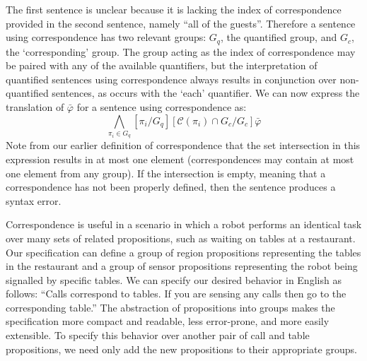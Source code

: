 The first sentence is unclear because it is lacking the index of correspondence provided in the second sentence, namely ``all of the guests''. 
Therefore a sentence using correspondence has two relevant groups: $G_q$, the quantified group, and $G_c$, the `corresponding' group. 
The group acting as the index of correspondence may be paired with any of the available quantifiers, but the interpretation of quantified sentences using correspondence always results in conjunction over non-quantified sentences, as occurs with the `each' quantifier. 
We can now express the translation of $\bar{\varphi}$ for a sentence using correspondence as:
\begin{equation*}
	\bigwedge \limits_{\pi_i \in G_q} [\pi_i / G_q] [\mathcal{C}(\pi_i) \cap G_c / G_c] \bar{\varphi}
\end{equation*}
Note from our earlier definition of correspondence that the set intersection in this expression results in at most one element (correspondences may contain at most one element from any group). 
If the intersection is empty, meaning that a correspondence has not been properly defined, then the sentence produces a syntax error. 

\begin{myExample}\label{Ex:corresponding}
	Correspondence is useful in a scenario in which a robot performs an identical task over many sets of related propositions, such as waiting on tables at a restaurant. 
	Our specification can define a group of region propositions representing the tables in the restaurant and a group of sensor propositions representing the robot being signalled by specific tables. We can specify our desired behavior in English as follows: 
	``Calls correspond to tables. 
	If you are sensing any calls then go to the corresponding table.''
	The abstraction of propositions into groups makes the specification more compact and readable, less error-prone, and more easily extensible. 
	To specify this behavior over another pair of call and table propositions, we need only add the new propositions to their appropriate groups. 
\end{myExample}
